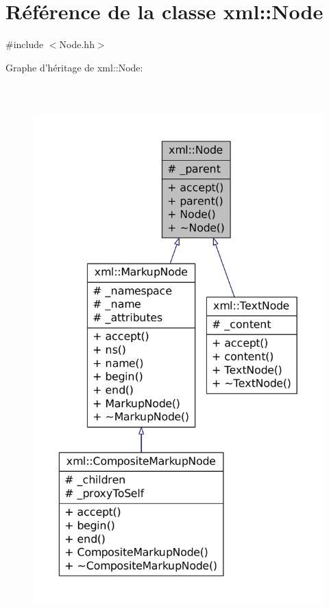 \hypertarget{classxml_1_1_node}{
\section{Référence de la classe xml::Node}
\label{classxml_1_1_node}
}


{\ttfamily \#include $<$Node.hh$>$}



Graphe d'héritage de xml::Node:
\nopagebreak
\begin{figure}[H]
\begin{center}
\leavevmode
\includegraphics[height=600pt]{classxml_1_1_node__inherit__graph}
\end{center}
\end{figure}


